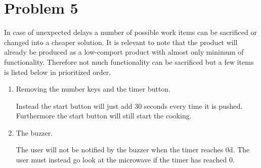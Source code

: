 \chapter{Problem 5}

In case of unexpected delays a number of possible work items can be sacrificed or changed into a cheaper solution. It is relevant to note that the product will already be produced as a low-comport product with almost only minimum of functionality. Therefore not much functionality can be sacrificed but a few items is listed below in prioritized order. 

\begin{enumerate}
\item Removing the number keys and the timer button. 

Instead the start button will just add 30 seconds every time it is pushed. Furthermore the start button will still start the cooking.
	
\item The buzzer. 

The user will not be notified by the buzzer when the timer reaches 0d. The user must instead go look at the microwave if the timer has reached 0.


\end{enumerate}


